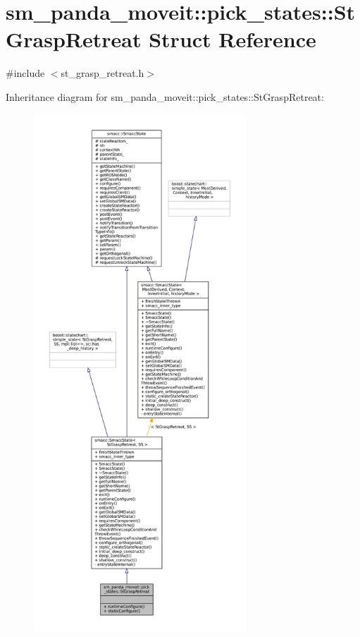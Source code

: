 \hypertarget{structsm__panda__moveit_1_1pick__states_1_1StGraspRetreat}{}\section{sm\+\_\+panda\+\_\+moveit\+:\+:pick\+\_\+states\+:\+:St\+Grasp\+Retreat Struct Reference}
\label{structsm__panda__moveit_1_1pick__states_1_1StGraspRetreat}


{\ttfamily \#include $<$st\+\_\+grasp\+\_\+retreat.\+h$>$}



Inheritance diagram for sm\+\_\+panda\+\_\+moveit\+:\+:pick\+\_\+states\+:\+:St\+Grasp\+Retreat\+:
\nopagebreak
\begin{figure}[H]
\begin{center}
\leavevmode
\includegraphics[height=550pt]{structsm__panda__moveit_1_1pick__states_1_1StGraspRetreat__inherit__graph}
\end{center}
\end{figure}


